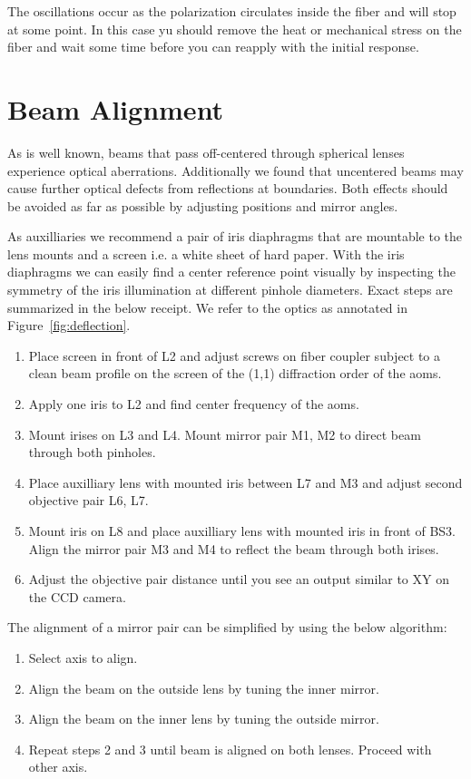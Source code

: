 The oscillations occur as the polarization circulates inside the fiber and
will stop at some point. In this case yu should remove the heat or mechanical 
stress on the fiber and wait some time before you can reapply with the initial
response.

\section{Beam Alignment}

As is well known, beams that pass off-centered through spherical lenses
experience optical aberrations. Additionally we found that uncentered beams
may cause further optical defects from reflections at boundaries. Both effects
should be avoided as far as possible by adjusting positions and mirror angles.

As auxilliaries we recommend a pair of iris diaphragms that are mountable to
the lens mounts and a screen i.e. a white sheet of hard paper. With the iris
diaphragms we can easily find a center reference point visually by inspecting
the symmetry of the iris illumination at different pinhole diameters. Exact
steps are summarized in the below receipt. We refer to the optics as annotated
in Figure~\ref{fig:deflection}.

\begin{enumerate}
  \item Place screen in front of L2 and adjust screws on fiber coupler subject
    to a clean beam profile on the screen of the (1,1) diffraction order of
    the \gls*{aom}s.
  \item Apply one iris to L2 and find center frequency of the \gls*{aom}s.
  \item Mount irises on L3 and L4. Mount mirror pair M1, M2 to direct beam
    through both pinholes.
  \item Place auxilliary lens with mounted iris between L7 and M3 and adjust
    second objective pair L6, L7.
  \item Mount iris on L8 and place auxilliary lens with mounted iris in front
    of BS3. Align the mirror pair M3 and M4 to reflect the beam through both
    irises.
  \item Adjust the objective pair distance until you see an output similar to
    XY on the \gls{CCD} camera.
\end{enumerate}

The alignment of a mirror pair can be simplified by using the below algorithm:

\begin{enumerate}
  \item Select axis to align.
  \item Align the beam on the outside lens by tuning the inner mirror.
  \item Align the beam on the inner lens by tuning the outside mirror.
  \item Repeat steps 2 and 3 until beam is aligned on both lenses. Proceed
    with other axis.
\end{enumerate}

